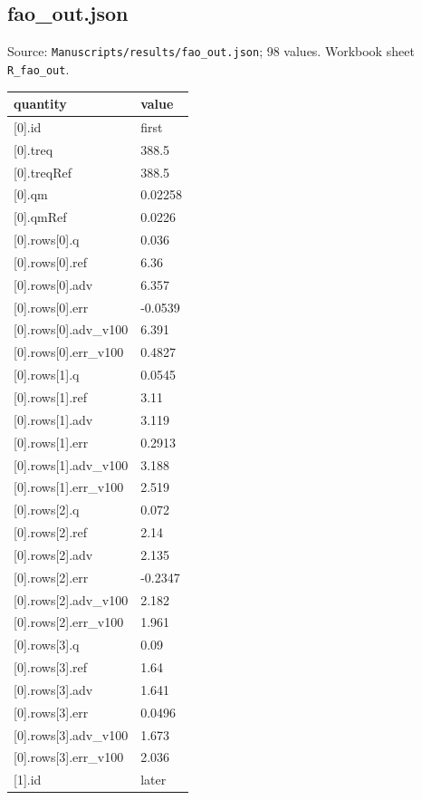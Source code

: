 \subsection*{fao\_out.json}
\noindent\small Source: \nolinkurl{Manuscripts/results/fao_out.json}; 98 values. Workbook sheet \texttt{R\_fao\_out}.\par
{\scriptsize\begin{longtable}{p{}p{}}\toprule\textbf{quantity} & \textbf{value}\\\midrule\endhead
{}[0].id & first\\
{}[0].treq & 388.5\\
{}[0].treqRef & 388.5\\
{}[0].qm & 0.02258\\
{}[0].qmRef & 0.0226\\
{}[0].rows[0].q & 0.036\\
{}[0].rows[0].ref & 6.36\\
{}[0].rows[0].adv & 6.357\\
{}[0].rows[0].err & -0.0539\\
{}[0].rows[0].adv\_v100 & 6.391\\
{}[0].rows[0].err\_v100 & 0.4827\\
{}[0].rows[1].q & 0.0545\\
{}[0].rows[1].ref & 3.11\\
{}[0].rows[1].adv & 3.119\\
{}[0].rows[1].err & 0.2913\\
{}[0].rows[1].adv\_v100 & 3.188\\
{}[0].rows[1].err\_v100 & 2.519\\
{}[0].rows[2].q & 0.072\\
{}[0].rows[2].ref & 2.14\\
{}[0].rows[2].adv & 2.135\\
{}[0].rows[2].err & -0.2347\\
{}[0].rows[2].adv\_v100 & 2.182\\
{}[0].rows[2].err\_v100 & 1.961\\
{}[0].rows[3].q & 0.09\\
{}[0].rows[3].ref & 1.64\\
{}[0].rows[3].adv & 1.641\\
{}[0].rows[3].err & 0.0496\\
{}[0].rows[3].adv\_v100 & 1.673\\
{}[0].rows[3].err\_v100 & 2.036\\
{}[1].id & later\\

\end{longtable}}
